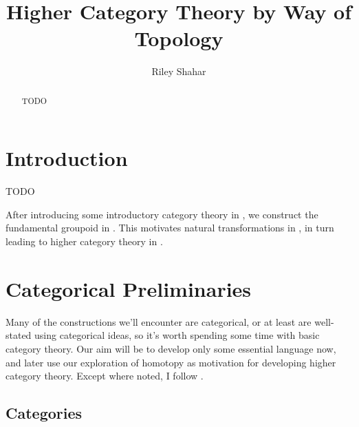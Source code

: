 \documentclass[11 pt]{amsart}
\title{ Higher Category Theory by Way of Topology}
\author{Riley Shahar}
\theoremstyle{plain}   %
\theoremstyle{definition}
\theoremstyle{remark}
\numberwithin{equation}{section}
\begin{document}
\begin{abstract}
	TODO
\end{abstract}


\maketitle

\section{Introduction}

TODO

After introducing some introductory category theory in , we
construct the fundamental groupoid in . This
motivates natural transformations in , in turn
leading to higher category theory in .

\section{Categorical Preliminaries}\label{categories}

Many of the constructions we'll encounter are categorical, or at least are
well-stated using categorical ideas, so it's worth spending some time with basic
category theory. Our aim will be to develop only some essential language now,
and later use our exploration of homotopy as motivation for developing higher
category theory. Except where noted, I follow \cite[Sections 1.1-1.3]{Riehl}.

\subsection{Categories}
\end{document}
